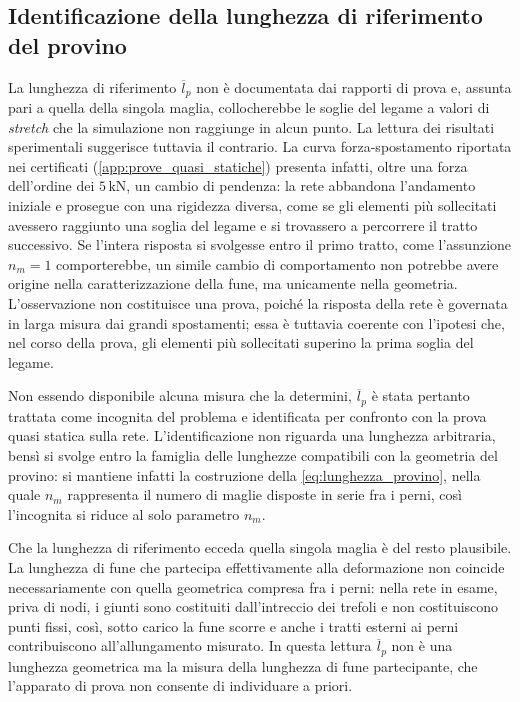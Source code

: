 \subsection{Identificazione della lunghezza di riferimento del provino}
\label{sec:identificazione_lunghezza_provino}

La lunghezza di riferimento $\overline{l}_p$ non è documentata dai rapporti di prova e, assunta pari a quella della singola maglia, collocherebbe le soglie del legame a valori di \textit{stretch} che la simulazione non raggiunge in alcun punto. La lettura dei risultati sperimentali suggerisce tuttavia il contrario. La curva forza-spostamento riportata nei certificati (\cref{app:prove_quasi_statiche}) presenta infatti, oltre una forza dell'ordine dei $5\,\text{kN}$, un cambio di pendenza: la rete abbandona l'andamento iniziale e prosegue con una rigidezza diversa, come se gli elementi più sollecitati avessero raggiunto una soglia del legame e si trovassero a percorrere il tratto successivo. Se l'intera risposta si svolgesse entro il primo tratto, come l'assunzione $n_m = 1$ comporterebbe, un simile cambio di comportamento non potrebbe avere origine nella caratterizzazione della fune, ma unicamente nella geometria. L'osservazione non costituisce una prova, poiché la risposta della rete è governata in larga misura dai grandi spostamenti; essa è tuttavia coerente con l'ipotesi che, nel corso della prova, gli elementi più sollecitati superino la prima soglia del legame. 

Non essendo disponibile alcuna misura che la determini, $\overline{l}_p$ è stata pertanto trattata come incognita del problema e identificata per confronto con la prova quasi statica sulla rete. L'identificazione non riguarda una lunghezza arbitraria, bensì si svolge entro la famiglia delle lunghezze compatibili con la geometria del provino: si mantiene infatti la costruzione della \eqref{eq:lunghezza_provino}, nella quale $n_m$ rappresenta il numero di maglie disposte in serie fra i perni, così l'incognita si riduce al solo parametro $n_m$.

Che la lunghezza di riferimento ecceda quella singola maglia è del resto plausibile. La lunghezza di fune che partecipa effettivamente alla deformazione non coincide necessariamente con quella geometrica compresa fra i perni: nella rete in esame, priva di nodi, i giunti sono costituiti dall'intreccio dei trefoli e non costituiscono punti fissi, così, sotto carico la fune scorre e anche i tratti esterni ai perni contribuiscono all'allungamento misurato. In questa lettura $\overline{l}_p$ non è una lunghezza geometrica ma la misura della lunghezza di fune partecipante, che l'apparato di prova non consente di individuare a priori.


